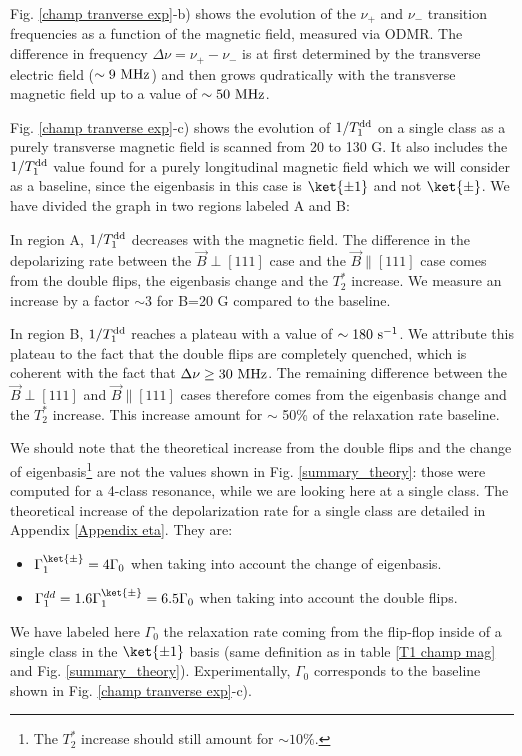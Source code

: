 \documentclass[a4paper, 11pt]{report}
\begin{document}

Fig. \ref{champ tranverse exp}-b) shows the evolution of the $\nu_+$ and $\nu_-$ transition frequencies as a function of the magnetic field, measured via ODMR. The difference in frequency $\Delta \nu = \nu_+ - \nu_-$ is at first determined by the transverse electric field ($\sim 9\ \rm MHz$) and then grows qudratically with the transverse magnetic field up to a value of $\sim 50\ \rm MHz$.

Fig. \ref{champ tranverse exp}-c) shows the evolution of $1/T_1^{\rm dd}$ on a single class as a purely transverse magnetic field is scanned from 20 to 130 G. It also includes the $1/T_1^{\rm dd}$ value found for a purely longitudinal magnetic field which we will consider as a baseline, since the eigenbasis in this case is $\ket{\pm 1}$ and not $\ket{\pm}$. We have divided the graph in two regions labeled A and B:

In region A, $1/T_1^{\rm dd}$ decreases with the magnetic field. The difference in the depolarizing rate between the $\vec{B} \perp [111]$ case and the $\vec{B} \parallel [111]$ case comes from the double flips, the eigenbasis change and the $T_2^*$ increase. We measure an increase by a factor $\sim 3$ for B=20 G compared to the baseline.

In region B, $1/T_1^{\rm dd}$ reaches a plateau with a value of $\sim 180\ \rm s^{-1}$. We attribute this plateau to the fact that the double flips are completely quenched, which is coherent with the fact that $\Delta \nu \geq 30\ \rm MHz$. The remaining difference between the $\vec{B} \perp [111]$ and $\vec{B} \parallel [111]$ cases therefore comes from the eigenbasis change and the $T_2^*$ increase. This increase amount for $\sim$ 50\% of the relaxation rate baseline.

We should note that the theoretical increase from the double flips and the change of eigenbasis\footnote{The $T_2^*$ increase should still amount for $\sim 10\%$.} are not the values shown in Fig. \ref{summary_theory}: those were computed for a 4-class resonance, while we are looking here at a single class. The theoretical increase of the depolarization rate for a single class are detailed in Appendix \ref{Appendix eta}. They are:
\begin{itemize}
\item $\Gamma_1^{\ket{\pm}}=4 \Gamma_0$ when taking into account the change of eigenbasis.
\item $\Gamma_1^{dd}=1.6\Gamma_1^{\ket{\pm}}=6.5\Gamma_0$ when taking into account the double flips.
\end{itemize}
We have labeled here $\Gamma_0$ the relaxation rate coming from the flip-flop inside of a single class in the $\ket{\pm 1}$ basis (same definition as in table \ref{T1 champ mag} and Fig. \ref{summary_theory}). Experimentally, $\Gamma_0$ corresponds to the baseline shown in Fig. \ref{champ tranverse exp}-c).
\end{document}
